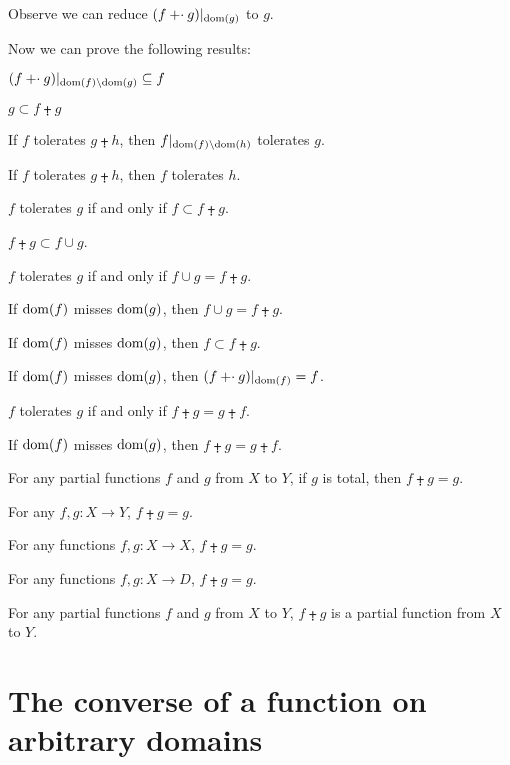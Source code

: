 \documentclass{article}
\begin{document}
Observe we can reduce $(f\mathbin{\mathord{+}\cdot} g)|_{\operatorname{dom}(g)}$ to $g$.

Now we can prove the following results:
\begin{thm}
\item\label{funct4:24} $(f\mathbin{\mathord{+}\cdot} g)|_{\operatorname{dom}(f)\setminus\operatorname{dom}(g)}\subseteq f$
\item\label{funct4:25} $g\subset f\plusdot g$
\item\label{funct4:26} If $f$ tolerates $g\plusdot h$,
  then $f|_{\operatorname{dom}(f)\setminus\operatorname{dom}(h)}$ tolerates $g$.
\item\label{funct4:27} If $f$ tolerates $g\plusdot h$,
  then $f$ tolerates $h$.
\item\label{funct4:28} $f$ tolerates $g$ if and only if $f\subset f\plusdot g$.
\item\label{funct4:29} $f\plusdot g\subset f\cup g$.
\item\label{funct4:30} $f$ tolerates $g$ if and only if $f\cup g=f\plusdot g$.
\item\label{funct4:31} If $\operatorname{dom}(f)$ misses $\operatorname{dom}(g)$, then
  $f\cup g=f\plusdot g$.
\item\label{funct4:32} If $\operatorname{dom}(f)$ misses $\operatorname{dom}(g)$,
  then $f\subset f\plusdot g$.
\item\label{funct4:33} If $\operatorname{dom}(f)$ misses $\operatorname{dom}(g)$,
  then $(f\mathbin{\mathord{+}\cdot} g)|_{\operatorname{dom}(f)}=f$.
\item\label{funct4:34} $f$ tolerates $g$ if and only if
  $f\plusdot g=g\plusdot f$.
\item\label{funct4:35} If $\operatorname{dom}(f)$ misses $\operatorname{dom}(g)$, then
  $f\plusdot g=g\plusdot f$.
\item\label{funct4:36} For any partial functions $f$ and $g$ from $X$ to $Y$,
  if $g$ is total, then $f\plusdot g=g$.
\item\label{funct4:37} For any $f,g\colon X\to Y$,
  $f\plusdot g=g$.
\item\label{funct4:38} For any functions $f,g\colon X\to X$,
  $f\plusdot g=g$.
\item\label{funct4:39} For any functions $f,g\colon X\to D$,
  $f\plusdot g=g$.
\item\label{funct4:40} For any partial functions $f$ and $g$ from $X$ to $Y$,
  $f\plusdot g$ is a partial function from $X$ to $Y$.
\end{thm}

\section{The converse of a function on arbitrary domains}
\end{document}
